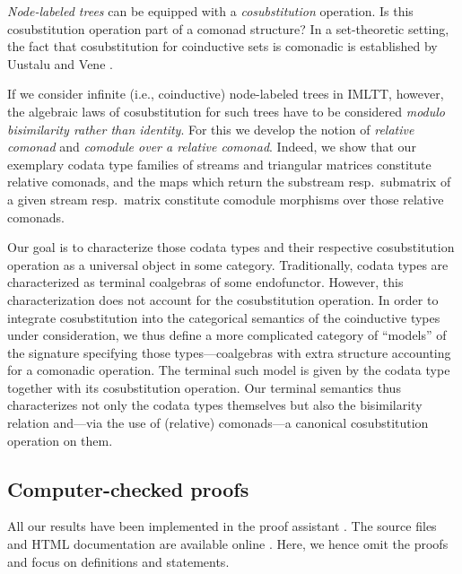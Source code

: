 \documentclass[a4paper,USenglish]{lipics}
\newcommand{\parencite}[1]{\cite{#1}}
\begin{document}
 
 \emph{Node-labeled trees} can be equipped with a \emph{cosubstitution} operation. 
 Is this cosubstitution operation part of a comonad structure?
 In a set-theoretic setting, the fact that cosubstitution for coinductive sets is comonadic is established by Uustalu and Vene \cite{DBLP:conf/sfp/UustaluV01}.
 
  
 If we consider infinite (i.e., coinductive) node-labeled trees in IMLTT, however, the algebraic laws of cosubstitution for such trees have to be considered 
 \emph{modulo bisimilarity rather than identity}.
 For this we develop the notion of \emph{relative comonad} and \emph{comodule over a relative comonad}.
 Indeed, we show that our exemplary codata type families of streams and triangular matrices constitute relative comonads, and the maps which 
 return the substream resp.\ submatrix of a given stream resp.\ matrix constitute comodule morphisms over those relative comonads.
 
 Our goal is to characterize those codata types and their respective cosubstitution operation as a universal object in some category.
 Traditionally, codata types are characterized as terminal coalgebras of some endofunctor. However, this characterization does not account for 
 the cosubstitution operation.
 In order to integrate cosubstitution into the categorical semantics of the coinductive types under consideration,
 we thus define a more complicated category of \enquote{models} of the signature specifying those types---coalgebras with extra structure accounting for a 
 comonadic operation.
 The terminal such model is given by the codata type together with its cosubstitution operation.
 Our terminal semantics thus characterizes not only the codata types themselves but also the bisimilarity relation 
 and---via the use of (relative) comonads---a canonical cosubstitution operation on them.
 
 

 \subsection{Computer-checked proofs}\label{sec:computer_checked}

 
 All our results have been implemented in the proof assistant \coq \parencite{coq84pl4}.
 The \coq source files and HTML documentation are available online \parencite{trimat_coq}.
 Here, we hence omit the proofs and focus on definitions and statements.
 

 
 
\end{document}
